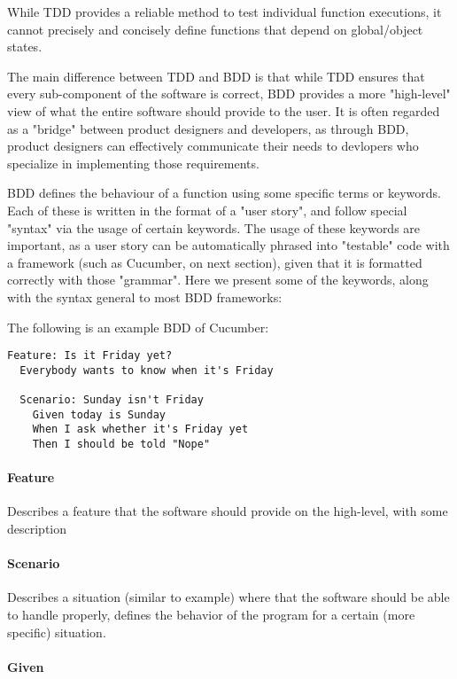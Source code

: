 While TDD provides a reliable method to test individual function executions, it cannot precisely and concisely define functions that depend on global/object states.

The main difference between TDD and BDD is that while TDD ensures that every sub-component of the software is correct, BDD provides a more "high-level" view of what the entire software should provide to the user. It is often regarded as a "bridge" between product designers and developers, as through BDD, product designers can effectively communicate their needs to devlopers who specialize in implementing those requirements. 

BDD defines the behaviour of a function using some specific terms or keywords. Each of these is written in the format of a "user story", and follow special "syntax" via the usage of certain keywords. The usage of these keywords are important, as a user story can be automatically phrased into "testable" code with a framework (such as Cucumber, on next section), given that it is formatted correctly with those "grammar". Here we present some of the keywords, along with the syntax general to most BDD frameworks:

The following is an example BDD of Cucumber:

\begin{lstlisting}[style=Cpp]
Feature: Is it Friday yet?
  Everybody wants to know when it's Friday

  Scenario: Sunday isn't Friday
    Given today is Sunday
    When I ask whether it's Friday yet
    Then I should be told "Nope"
\end{lstlisting}

\paragraph{Feature}

Describes a feature that the software should provide on the high-level, with some description

\paragraph{Scenario}

Describes a situation (similar to example) where that the software should be able to handle properly, defines the behavior of the program for a certain (more specific) situation. 

\paragraph{Given}

